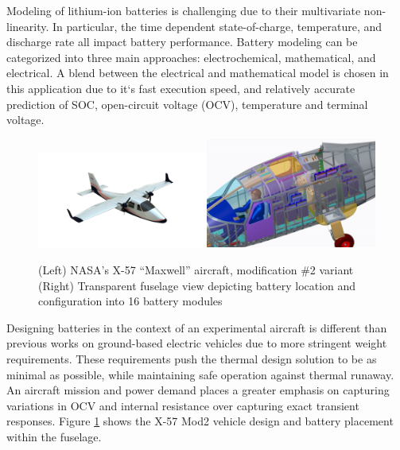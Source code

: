 \documentclass[]{aiaa-tc}%
\begin{document}
Modeling of lithium-ion batteries is challenging due to their multivariate non-linearity. In particular, the time dependent state-of-charge, temperature, and discharge rate all impact battery performance. Battery modeling can be categorized into three main approaches: electrochemical, mathematical, and electrical. A blend between the electrical and mathematical model is chosen in this application due to it`s fast execution speed, and relatively accurate prediction of SOC, open-circuit voltage (OCV), temperature and terminal voltage.

\begin{figure}[!htb]%
	\centering
	\includegraphics[width=0.5\textwidth]{figures/X57_mod2.png}\includegraphics[width=0.5\textwidth]{figures/batt_loc.png}
	\caption{(Left) NASA's X-57 ``Maxwell'' aircraft, modification \#2 variant
	(Right) Transparent fuselage view depicting battery location and configuration into 16 battery modules}
	\label{fig:X57}
\end{figure}

Designing batteries in the context of an experimental aircraft is different than previous works on ground-based electric vehicles due to more stringent weight requirements. These requirements push the thermal design solution to be as minimal as possible, while maintaining safe operation against thermal runaway. An aircraft mission and power demand places a greater emphasis on capturing variations in OCV and internal resistance over capturing exact transient responses. Figure \ref{fig:X57} shows the X-57 Mod2 vehicle design and battery placement within the fuselage. 
\end{document}
